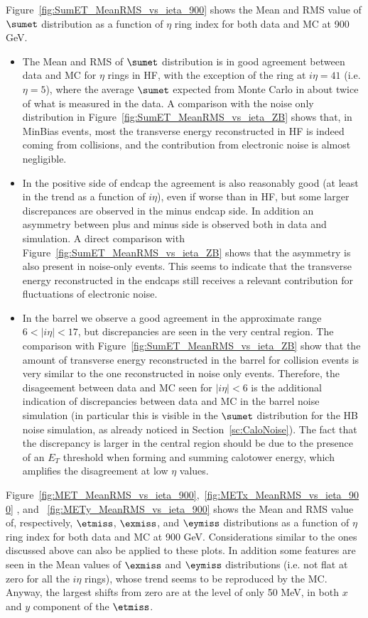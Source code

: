 Figure~\ref{fig:SumET_MeanRMS_vs_ieta_900} shows the Mean and RMS value of 
$\sumet$ distribution as a function of $\eta$ ring index for both data and MC at 900 GeV.
\begin{itemize}
\item The Mean and RMS of $\sumet$ distribution is in good agreement between 
data and MC for $\eta$ rings in HF, with the exception 
of the ring at $i\eta=41$ (i.e. $\eta=5$), where the average $\sumet$ expected from Monte Carlo 
in about twice of what is measured in the data.
A comparison with the noise only distribution 
in Figure~\ref{fig:SumET_MeanRMS_vs_ieta_ZB} shows that, in MinBias events, 
most the transverse energy reconstructed in HF is indeed coming from collisions, and the contribution
from electronic noise is almost negligible.
\item In the positive side of endcap the agreement is also reasonably good 
(at least in the trend as a function of $i\eta$), even if worse than in HF, 
but some larger discrepances are observed in the minus endcap side.
In addition an asymmetry between plus and minus side is observed both in data and simulation.
A direct comparison with Figure~\ref{fig:SumET_MeanRMS_vs_ieta_ZB} shows that the asymmetry 
is also present in noise-only events. This seems to indicate that the transverse energy reconstructed in the 
endcaps still receives a relevant contribution for fluctuations of electronic noise. 
\item In the barrel we observe a good agreement in the approximate range $6<|i\eta|<17$, 
but discrepancies are seen in the very central region. 
The comparison with Figure~\ref{fig:SumET_MeanRMS_vs_ieta_ZB}
show that the amount of transverse energy reconstructed in the barrel for collision 
events is very similar to the one reconstructed in noise only events. 
Therefore, the disageement between data and MC seen for $|i\eta|<6$
is the additional indication of discrepancies between data and MC in 
the barrel noise simulation (in particular this is visible in the $\sumet$ distribution 
for the HB noise simulation, as already noticed in Section~\ref{sc:CaloNoise}).
The fact that the discrepancy is larger in the central region should be due to 
the presence of an $E_{T}$ threshold when forming and summing calotower energy, 
which amplifies the disagreement at low $\eta$ values. 
\end{itemize}

Figure~\ref{fig:MET_MeanRMS_vs_ieta_900},~\ref{fig:METx_MeanRMS_vs_ieta_900}
, and ~\ref{fig:METy_MeanRMS_vs_ieta_900} shows the Mean and RMS value of, respectively,
$\etmiss$, $\exmiss$, and $\eymiss$ distributions as a function of $\eta$ ring 
index for both data and MC at 900 GeV.
Considerations similar to the ones discussed above can also be applied to these plots.
In addition some features are seen in the Mean values of $\exmiss$ and $\eymiss$ distributions
(i.e. not flat at zero for all the $i\eta$ rings), whose trend seems to be reproduced by the MC.
Anyway, the largest shifts from zero are at the level of only 50 MeV, in both $x$ and $y$ component of the $\etmiss$.

